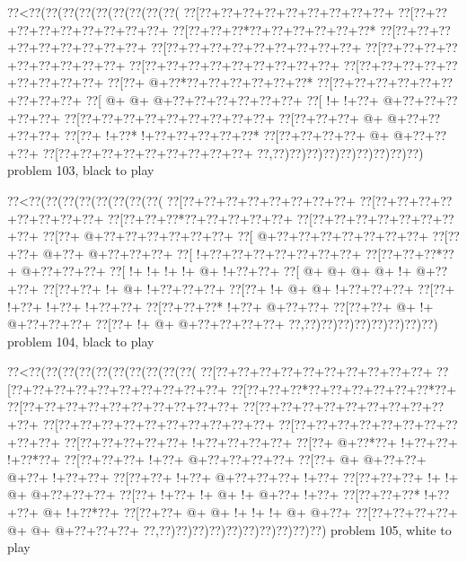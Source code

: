 \vbox{\vbox{\goo
\0??<\0??(\0??(\0??(\0??(\0??(\0??(\0??(\0??(\0??(
\0??[\0??+\0??+\0??+\0??+\0??+\0??+\0??+\0??+\0??+
\0??[\0??+\0??+\0??+\0??+\0??+\0??+\0??+\0??+\0??+
\0??[\0??+\0??+\0??*\0??+\0??+\0??+\0??+\0??+\0??*
\0??[\0??+\0??+\0??+\0??+\0??+\0??+\0??+\0??+\0??+
\0??[\0??+\0??+\0??+\0??+\0??+\0??+\0??+\0??+\0??+
\0??[\0??+\0??+\0??+\0??+\0??+\0??+\0??+\0??+\0??+
\0??[\0??+\0??+\0??+\0??+\0??+\0??+\0??+\0??+\0??+
\0??[\0??+\0??+\0??+\0??+\0??+\0??+\0??+\0??+\0??+
\0??[\0??+\- @+\0??*\0??+\0??+\0??+\0??+\0??+\0??*
\0??[\0??+\0??+\0??+\0??+\0??+\0??+\0??+\0??+\0??+
\0??[\- @+\- @+\- @+\0??+\0??+\0??+\0??+\0??+\0??+
\0??[\- !+\- !+\0??+\- @+\0??+\0??+\0??+\0??+\0??+
\0??[\0??+\0??+\0??+\0??+\0??+\0??+\0??+\0??+\0??+
\0??[\0??+\0??+\0??+\- @+\- @+\0??+\0??+\0??+\0??+
\0??[\0??+\- !+\0??*\- !+\0??+\0??+\0??+\0??+\0??*
\0??[\0??+\0??+\0??+\0??+\- @+\- @+\0??+\0??+\0??+
\0??[\0??+\0??+\0??+\0??+\0??+\0??+\0??+\0??+\0??+
\0??,\0??)\0??)\0??)\0??)\0??)\0??)\0??)\0??)\0??)
}
\hfil problem 103, black to play\hfil\break
}

\vbox{\vbox{\goo
\0??<\0??(\0??(\0??(\0??(\0??(\0??(\0??(\0??(
\0??[\0??+\0??+\0??+\0??+\0??+\0??+\0??+\0??+
\0??[\0??+\0??+\0??+\0??+\0??+\0??+\0??+\0??+
\0??[\0??+\0??+\0??*\0??+\0??+\0??+\0??+\0??+
\0??[\0??+\0??+\0??+\0??+\0??+\0??+\0??+\0??+
\0??[\0??+\- @+\0??+\0??+\0??+\0??+\0??+\0??+
\0??[\- @+\0??+\0??+\0??+\0??+\0??+\0??+\0??+
\0??[\0??+\0??+\- @+\0??+\- @+\0??+\0??+\0??+
\0??[\- !+\0??+\0??+\0??+\0??+\0??+\0??+\0??+
\0??[\0??+\0??+\0??*\0??+\- @+\0??+\0??+\0??+
\0??[\- !+\- !+\- !+\- !+\- @+\- !+\0??+\0??+
\0??[\- @+\- @+\- @+\- @+\- !+\- @+\0??+\0??+
\0??[\0??+\0??+\- !+\- @+\- !+\0??+\0??+\0??+
\0??[\0??+\- !+\- @+\- @+\- !+\0??+\0??+\0??+
\0??[\0??+\- !+\0??+\- !+\0??+\- !+\0??+\0??+
\0??[\0??+\0??+\0??*\- !+\0??+\- @+\0??+\0??+
\0??[\0??+\0??+\- @+\- !+\- @+\0??+\0??+\0??+
\0??[\0??+\- !+\- @+\- @+\0??+\0??+\0??+\0??+
\0??,\0??)\0??)\0??)\0??)\0??)\0??)\0??)\0??)
}
\hfil problem 104, black to play\hfil\break
}

\vbox{\vbox{\goo
\0??<\0??(\0??(\0??(\0??(\0??(\0??(\0??(\0??(\0??(\0??(
\0??[\0??+\0??+\0??+\0??+\0??+\0??+\0??+\0??+\0??+\0??+
\0??[\0??+\0??+\0??+\0??+\0??+\0??+\0??+\0??+\0??+\0??+
\0??[\0??+\0??+\0??*\0??+\0??+\0??+\0??+\0??+\0??*\0??+
\0??[\0??+\0??+\0??+\0??+\0??+\0??+\0??+\0??+\0??+\0??+
\0??[\0??+\0??+\0??+\0??+\0??+\0??+\0??+\0??+\0??+\0??+
\0??[\0??+\0??+\0??+\0??+\0??+\0??+\0??+\0??+\0??+\0??+
\0??[\0??+\0??+\0??+\0??+\0??+\0??+\0??+\0??+\0??+\0??+
\0??[\0??+\0??+\0??+\0??+\0??+\- !+\0??+\0??+\0??+\0??+
\0??[\0??+\- @+\0??*\0??+\- !+\0??+\0??+\- !+\0??*\0??+
\0??[\0??+\0??+\0??+\- !+\0??+\- @+\0??+\0??+\0??+\0??+
\0??[\0??+\- @+\- @+\0??+\0??+\- @+\0??+\- !+\0??+\0??+
\0??[\0??+\0??+\- !+\0??+\- @+\0??+\0??+\0??+\- !+\0??+
\0??[\0??+\0??+\0??+\- !+\- !+\- @+\- @+\0??+\0??+\0??+
\0??[\0??+\- !+\0??+\- !+\- @+\- !+\- @+\0??+\- !+\0??+
\0??[\0??+\0??+\0??*\- !+\0??+\0??+\- @+\- !+\0??*\0??+
\0??[\0??+\0??+\- @+\- @+\- !+\- !+\- !+\- @+\- @+\0??+
\0??[\0??+\0??+\0??+\0??+\- @+\- @+\- @+\0??+\0??+\0??+
\0??,\0??)\0??)\0??)\0??)\0??)\0??)\0??)\0??)\0??)\0??)
}
\hfil problem 105, white to play\hfil\break
}

